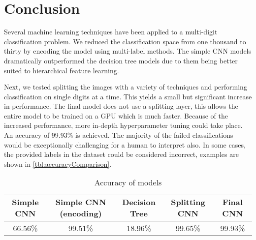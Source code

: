 \chapter{Conclusion}
Several machine learning techniques have been applied to a multi-digit classification problem. We reduced the classification space from one thousand to thirty by encoding the model using multi-label methods. The simple CNN models dramatically outperformed the decision tree models due to them being better suited to hierarchical feature learning. 

Next, we tested splitting the images with a variety of techniques and performing classification on single digits at a time. This yields a small but significant increase in performance. The final model does not use a splitting layer, this allows the entire model to be trained on a GPU which is much faster. Because of the increased performance, more in-depth hyperparameter tuning could take place. An accuracy of 99.93\% is achieved. The majority of the failed classifications would be exceptionally challenging for a human to interpret also. In some cases, the provided labels in the dataset could be considered incorrect, examples are shown in \autoref{tbl:accuracyComparison}.

\vspace{10pt}
\bgroup
    \begin{table}[!htbp]
        \centering
        \begin{tabular}{ccccc}
            \hline
            Simple CNN & Simple CNN (encoding) & Decision Tree & Splitting CNN & Final CNN \\ \hline
            66.56\% & 99.51\% & 18.96\% & 99.65\% & 99.93\% \\
        \end{tabular}
        \caption{Accuracy of models}
        \label{tbl:accuracyComparison}
    \end{table}
\egroup


